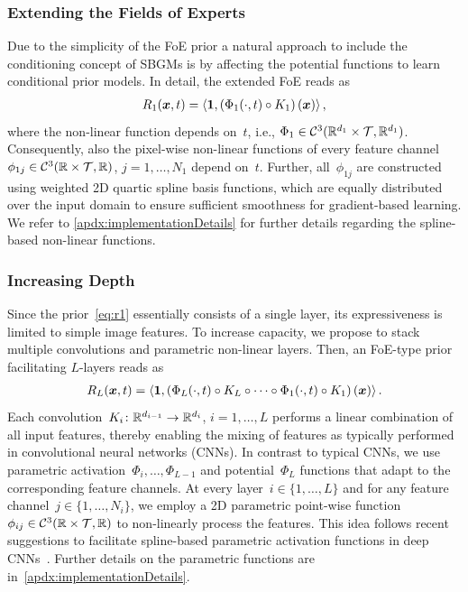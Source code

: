 \documentclass{article}
\newcommand{\C}{\mathcal{C}}
\newcommand{\T}{\mathcal{T}}
\newcommand{\scal}[2]{\left\langle#1,#2\right\rangle}
\renewcommand{\vec}[1]{\mathbf{#1}}
\theoremstyle{plain}
\theoremstyle{definition}
\theoremstyle{remark}
\begin{document}
\subsubsection{Extending the Fields of Experts}
Due to the simplicity of the FoE prior a natural approach to include the conditioning concept of SBGMs is by affecting the potential functions to learn conditional prior models.
In detail, the extended FoE reads as
\begin{align}\label{eq:r1}
R_1(\vx,t) = \scal{\vec{1}}{\left(\Phi_1(\cdot, t) \circ K_1\right)(\vx)},
\end{align}
where the non-linear function depends on~$t$, i.e., $\Phi_1\in\C^3(\R^{d_1}\times\T,\R^{d_1})$.
Consequently, also the pixel-wise non-linear functions of every feature channel~$\phi_{1j}\in\C^3(\R\times\T,\R)$, $j=1,\ldots,N_1$ depend on~$t$. 
Further, all~$\phi_{1j}$ are constructed using weighted 2D quartic spline basis functions, which are equally distributed over the input domain to ensure sufficient smoothness for gradient-based learning.
We refer to \cref{apdx:implementationDetails} for further details regarding the spline-based non-linear functions.

\subsubsection{Increasing Depth}
Since the prior~\eqref{eq:r1} essentially consists of a single layer, its expressiveness is limited to simple image features.
To increase capacity, we propose to stack multiple convolutions and parametric non-linear layers.
Then, an FoE-type prior facilitating $L$-layers reads as
\begin{align} \label{eq:RL}
R_L(\vx,t) = \scal{\vec{1}}{\left(\Phi_L(\cdot,t)\circ K_L\circ\cdots\circ\Phi_1(\cdot, t) \circ K_1\right)(\vx)}.
\end{align}
Each convolution~$K_i\colon\mathbb{R}^{d_{i-1}}\to\mathbb{R}^{d_i}$, $i=1,\ldots,L$ performs a linear combination of all input features, thereby enabling the mixing of features as typically performed in convolutional neural networks (CNNs).
In contrast to typical CNNs, we use parametric activation~$\Phi_i,\ldots,\Phi_{L-1}$ and potential~$\Phi_L$ functions that adapt to the corresponding feature channels.
At every layer~$i\in\{1,\ldots,L\}$ and for any feature channel~$j\in\{1,\ldots,N_i\}$, we employ a 2D parametric point-wise function~$\phi_{ij}\in\C^3(\R\times\T,\R)$ to non-linearly process the features.
This idea follows recent suggestions to facilitate spline-based parametric activation functions in deep CNNs~\citep{OcMe18,AzGu20}.
Further details on the parametric functions are in~\cref{apdx:implementationDetails}.
\end{document}
